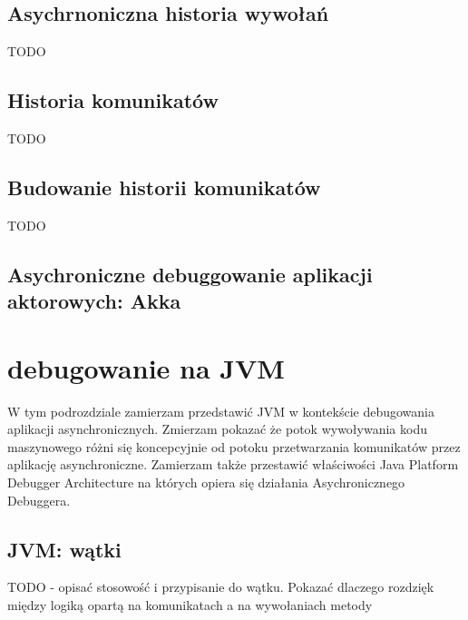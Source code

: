 \subsection{Asychrnoniczna historia wywołań}
TODO
\subsection{Historia komunikatów}
TODO
\subsection{Budowanie historii komunikatów}

TODO

\subsection{Asychroniczne debuggowanie aplikacji aktorowych: Akka}

\section{debugowanie na JVM}

W tym podrozdziale zamierzam przedstawić JVM w kontekście debugowania aplikacji asynchronicznych. Zmierzam pokazać że potok wywoływania kodu maszynowego różni się koncepcyjnie od potoku przetwarzania komunikatów przez aplikację asynchroniczne. Zamierzam także przestawić właściwości Java Platform Debugger Architecture na których opiera się działania Asychronicznego Debuggera.

\subsection{JVM: wątki}

TODO - opisać stosowość i przypisanie do wątku. Pokazać dlaczego rozdzięk między logiką opartą na komunikatach a na wywołaniach metody

